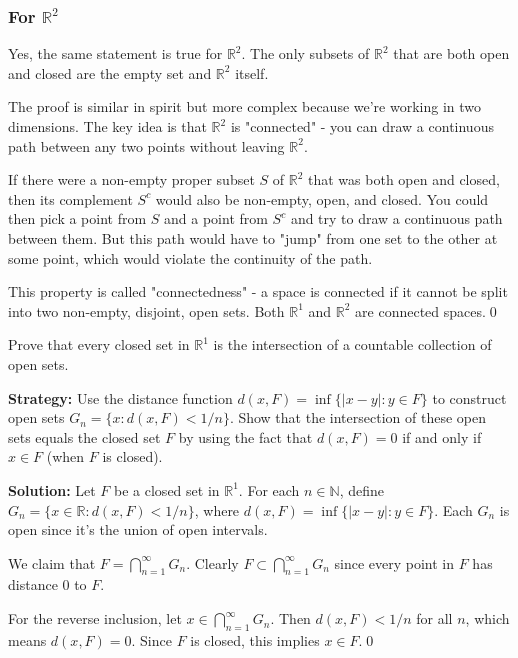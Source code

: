 \subsubsection*{For $\mathbb{R}^2$}

Yes, the same statement is true for $\mathbb{R}^2$. The only subsets of $\mathbb{R}^2$ that are both open and closed are the empty set and $\mathbb{R}^2$ itself.

The proof is similar in spirit but more complex because we're working in two dimensions. The key idea is that $\mathbb{R}^2$ is "connected" - you can draw a continuous path between any two points without leaving $\mathbb{R}^2$.

If there were a non-empty proper subset $S$ of $\mathbb{R}^2$ that was both open and closed, then its complement $S^c$ would also be non-empty, open, and closed. You could then pick a point from $S$ and a point from $S^c$ and try to draw a continuous path between them. But this path would have to "jump" from one set to the other at some point, which would violate the continuity of the path.

This property is called "connectedness" - a space is connected if it cannot be split into two non-empty, disjoint, open sets. Both $\mathbb{R}^1$ and $\mathbb{R}^2$ are connected spaces.\qed


\begin{problembox}
Prove that every closed set in $\mathbb{R}^1$ is the intersection of a countable collection of open sets.
\end{problembox}

\noindent\textbf{Strategy:} Use the distance function $d(x,F) = \inf\{|x-y| : y \in F\}$ to construct open sets $G_n = \{x : d(x,F) < 1/n\}$. Show that the intersection of these open sets equals the closed set $F$ by using the fact that $d(x,F) = 0$ if and only if $x \in F$ (when $F$ is closed).

\bigskip\noindent\textbf{Solution:} Let $F$ be a closed set in $\mathbb{R}^1$. For each $n \in \mathbb{N}$, define $G_n = \{x \in \mathbb{R} : d(x,F) < 1/n\}$, where $d(x,F) = \inf\{|x-y| : y \in F\}$. Each $G_n$ is open since it's the union of open intervals.

We claim that $F = \bigcap_{n=1}^{\infty} G_n$. Clearly $F \subset \bigcap_{n=1}^{\infty} G_n$ since every point in $F$ has distance 0 to $F$.

For the reverse inclusion, let $x \in \bigcap_{n=1}^{\infty} G_n$. Then $d(x,F) < 1/n$ for all $n$, which means $d(x,F) = 0$. Since $F$ is closed, this implies $x \in F$.\qed


